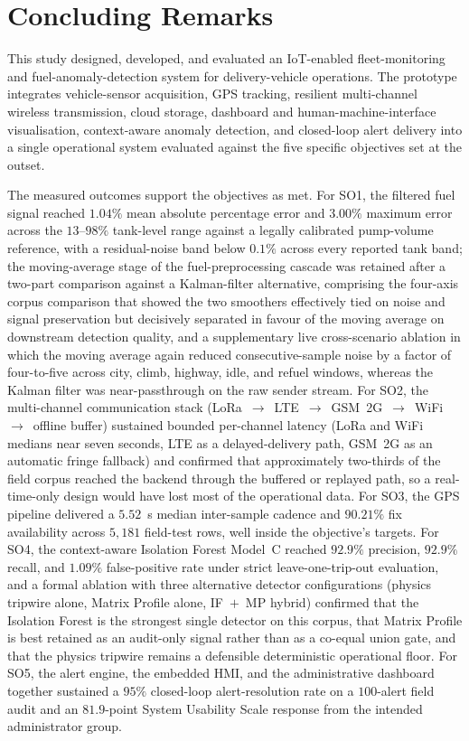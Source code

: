 \section{Concluding Remarks}

This study designed, developed, and evaluated an IoT-enabled fleet-monitoring and fuel-anomaly-detection system for delivery-vehicle operations. The prototype integrates vehicle-sensor acquisition, GPS tracking, resilient multi-channel wireless transmission, cloud storage, dashboard and human-machine-interface visualisation, context-aware anomaly detection, and closed-loop alert delivery into a single operational system evaluated against the five specific objectives set at the outset.

The measured outcomes support the objectives as met. For SO1, the filtered fuel signal reached $1.04\%$ mean absolute percentage error and $3.00\%$ maximum error across the $13$--$98\%$ tank-level range against a legally calibrated pump-volume reference, with a residual-noise band below $0.1\%$ across every reported tank band; the moving-average stage of the fuel-preprocessing cascade was retained after a two-part comparison against a Kalman-filter alternative, comprising the four-axis corpus comparison that showed the two smoothers effectively tied on noise and signal preservation but decisively separated in favour of the moving average on downstream detection quality, and a supplementary live cross-scenario ablation in which the moving average again reduced consecutive-sample noise by a factor of four-to-five across city, climb, highway, idle, and refuel windows, whereas the Kalman filter was near-passthrough on the raw sender stream. For SO2, the multi-channel communication stack (LoRa~$\rightarrow$~LTE~$\rightarrow$~GSM~2G~$\rightarrow$~WiFi~$\rightarrow$~offline buffer) sustained bounded per-channel latency (LoRa and WiFi medians near seven seconds, LTE as a delayed-delivery path, GSM~2G as an automatic fringe fallback) and confirmed that approximately two-thirds of the field corpus reached the backend through the buffered or replayed path, so a real-time-only design would have lost most of the operational data. For SO3, the GPS pipeline delivered a $5.52$~s median inter-sample cadence and $90.21\%$ fix availability across $5{,}181$ field-test rows, well inside the objective's targets. For SO4, the context-aware Isolation Forest Model~C reached $92.9\%$ precision, $92.9\%$ recall, and $1.09\%$ false-positive rate under strict leave-one-trip-out evaluation, and a formal ablation with three alternative detector configurations (physics tripwire alone, Matrix Profile alone, IF~$+$~MP hybrid) confirmed that the Isolation Forest is the strongest single detector on this corpus, that Matrix Profile is best retained as an audit-only signal rather than as a co-equal union gate, and that the physics tripwire remains a defensible deterministic operational floor. For SO5, the alert engine, the embedded HMI, and the administrative dashboard together sustained a $95\%$ closed-loop alert-resolution rate on a $100$-alert field audit and an $81.9$-point System Usability Scale response from the intended administrator group.

